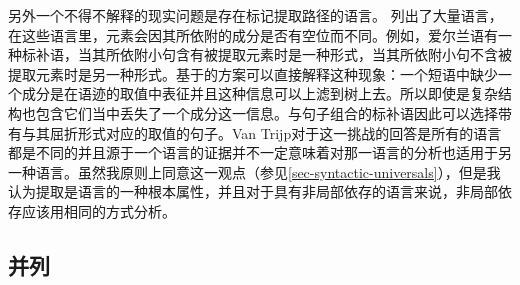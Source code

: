另外一个不得不解释的现实问题是存在标记提取路径的语言。 \citet*{BMS2001a}列出了大量语言，在这些语言里，元素会因其所依附的成分是否有空位而不同。例如，爱尔兰语有一种标补语，当其所依附小句含有被提取元素时是一种形式，当其所依附小句不含被提取元素时是另一种形式。基于\slaschc 的方案可以直接解释这种现象：一个短语中缺少一个成分是在语迹的\slaschc 取值中表征并且这种信息可以上滤到树上去。所以即使是复杂结构也包含它们当中丢失了一个成分这一信息。与句子组合的标补语因此可以选择带有与其屈折形式对应的\slaschc 取值的句子。Van Trijp对于这一挑战的回答是所有的语言都是不同的\citep[]{vanTrijp2014a}并且源于一个语言的证据并不一定意味着对那一语言的分析也适用于另一种语言。虽然我原则上同意这一观点（参见\ref{sec-syntactic-universals}），但是我认为提取是语言的一种根本属性，并且对于具有非局部依存的语言来说，非局部依存应该用相同的方式分析。

\subsection{并列}
\label{sec-coordination}

